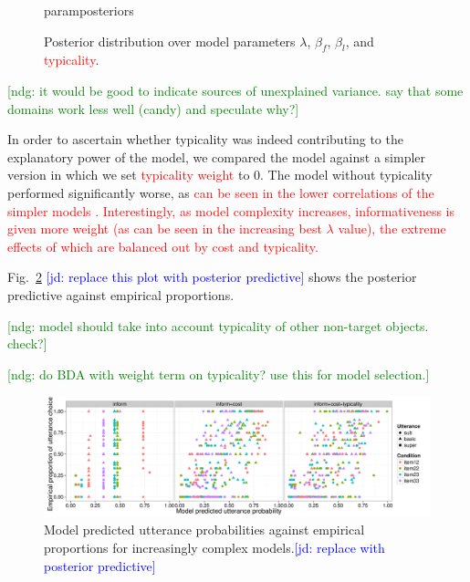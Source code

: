\documentclass[10pt,letterpaper]{article}
\newcommand{\jd}[1]{\textcolor{Blue}{[jd: #1]}}
\newcommand{\red}[1]{\textcolor{Red}{#1}}
\newcommand{\ndg}[1]{\textcolor{Green}{[ndg: #1]}}
\newcommand{\tableref}[1]{Table \ref{#1}}
\newcommand{\figref}[1]{Fig.~\ref{#1}}
\begin{document}
\begin{figure}
paramposteriors
\caption{Posterior distribution over model parameters $\lambda$, $\beta_f$, $\beta_l$, and \red{typicality}.}
\label{fig:paramposteriors}
\end{figure}


\ndg{it would be good to indicate sources of unexplained variance. say that some domains work less well (candy) and speculate why?}

In order to ascertain whether typicality was indeed contributing to the explanatory power of the model, we compared the model against a simpler version in which we set \red{typicality weight} to 0. %
The model without typicality performed significantly worse, as \red{can be seen in the lower correlations of the simpler models .
Interestingly, as model complexity increases, informativeness is given more weight (as can be seen in the increasing best $\lambda$ value), the extreme effects of which are balanced out by cost and typicality.}

\figref{fig:scatterplot} \jd{replace this plot with posterior predictive} shows the posterior predictive against empirical proportions.%

\ndg{model should take into account typicality of other non-target objects. check?}

\ndg{do BDA with weight term on typicality? use this for model selection.}



\begin{figure}[ht!]
\centering
\includegraphics[width=\textwidth]{graphs/scatterplot}
\caption{Model predicted utterance probabilities against empirical proportions for increasingly complex models.\jd{replace with posterior predictive}}
 \label{fig:scatterplot}
\end{figure}
\end{document}
